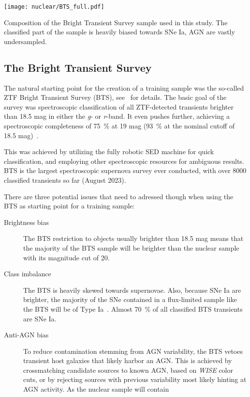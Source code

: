\begin{marginfigure}
  \texttt{[image: nuclear/BTS\_full.pdf]}
  \caption[BTS Composition]{Composition of the Bright Transient Survey sample used in this study. The classified part of the sample is heavily biased towards SNe Ia, AGN are vastly undersampled.}
\end{marginfigure}

\subsection{The Bright Transient Survey}\label{bts}
The natural starting point for the creation of a training sample was the so-called ZTF Bright Transient Survey (BTS), see~\cite{Fremling2020,Perley2020} for details. The basic goal of the survey was spectroscopic classification of all ZTF-detected transients brighter than 18.5 mag in either the \textit{g}- or \textit{r}-band. It even pushes further, achieving a spectroscopic completeness of \SI{75}{\percent} at 19 mag (\SI{93}{\percent} at the nominal cutoff of 18.5 mag)~\cite{Perley2020}.

This was achieved by utilizing the fully robotic SED machine for quick classification, and employing other spectroscopic resources for ambiguous results. BTS is the largest spectroscopic supernova survey ever conducted, with over 8000 classified transients so far (August 2023).

There are three potential issues that need to adressed though when using the BTS as starting point for a training sample:

\begin{description}
  \item[Brightness bias] The BTS restriction to objects usually brighter than 18.5 mag means that the majority of the BTS sample will be brighter than the nuclear sample with its magnitude cut of 20.
  \item[Class imbalance] The BTS is heavily skewed towards supernovae. Also, because SNe Ia are brighter, the majority of the SNe contained in a flux-limited sample like the BTS will be of Type Ia~\cite{Perley2020}. Almost \SI{70}{\percent} of all classified BTS transients are SNe Ia.
  \item[Anti-AGN bias] To reduce contamination stemming from AGN variability, the BTS vetoes transient host galaxies that likely harbor an AGN. This is achieved by crossmatching candidate sources to known AGN, based on \textit{WISE} color cuts, or by rejecting sources with previous variability most likely hinting at AGN activity. As the nuclear sample will contain
\end{description}

